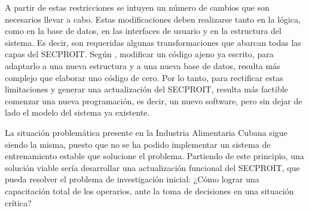 A partir de estas restricciones se intuyen un número de cambios que son necesarios llevar a cabo. Estas modificaciones deben realizarse tanto en la lógica, como en la base de datos, en las interfaces de usuario y en la estructura del sistema. Es decir, son requeridas algunas transformaciones que abarcan todas las capas del SECPROIT.  Según \cite{Plecka2013}, modificar un código ajeno ya escrito, para adaptarlo a una nueva estructura y a una nueva base de datos, resulta más complejo que elaborar uno código de cero. Por lo tanto, para rectificar estas limitaciones y generar una actualización del SECPROIT, resulta más factible comenzar una nueva programación, es decir, un nuevo software, pero sin dejar de lado el modelo del sistema ya existente.

La situación problemática presente en la Industria Alimentaria Cubana sigue siendo la misma, puesto que no se ha podido implementar un sistema de entrenamiento estable que solucione el problema. Partiendo de este principio, una solución viable sería desarrollar una actualización funcional del SECPROIT, que pueda resolver el problema de investigación inicial: 
¿Cómo lograr una capacitación total de los operarios, ante la toma de decisiones en una situación crítica?

